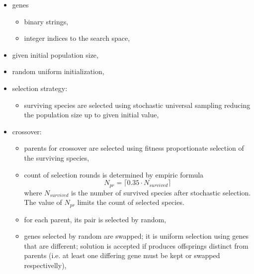 \documentclass[a4paper]{IEEEtran}
\begin{document}
\begin{itemize}
	\item genes 
	\begin{itemize}
		\item binary strings,
		\item integer indices to the search space,
	\end{itemize}
	\item given initial population size,
	\item random uniform initialization,
	\item selection strategy:
	\begin{itemize}
		\item surviving species are selected using stochastic universal 
		sampling reducing the population size up to given initial value,
	\end{itemize}
	\item crossover:
	\begin{itemize}
		\item parents for crossover are selected using fitness proportionate
		selection of the surviving species,
		\item count of selection rounds is determined by empiric formula
		\[ N_{pr} = \lceil 0.35\cdot N_{survived} \rceil \] 		
		where $ N_{survived} $ is the number of survived species after stochastic selection.
		The value of $ N_{pr} $ limits the count of selected species.
		\item for each parent, its pair is selected by random,
		\item genes selected by random are swapped; it is uniform selection using 
		genes that are different; solution is accepted if
		produces  offsprings distinct from parents (i.e. at least one differing gene must be kept or swapped respectivelly),
	\end{itemize}
\end{itemize}
\end{document}
